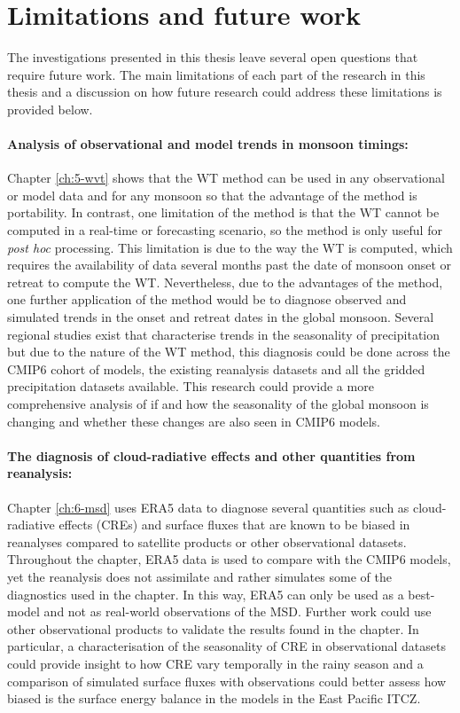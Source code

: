 \section{Limitations and future work}

The investigations presented in this thesis leave several open questions that require future work. 
The main limitations of each part of the research in this thesis and a discussion on how future research could address these limitations is provided below. 

\paragraph{Analysis of observational and model trends in monsoon timings:}
Chapter \ref{ch:5-wvt} shows that the WT method can be used in any observational or model data and for any monsoon so that the advantage of the method is portability.
In contrast, one limitation of the method is that the WT cannot be computed in a real-time or forecasting scenario, so the method is only useful for \textit{post hoc} processing. 
This limitation is due to the way the WT is computed, which requires the availability of data several months past the date of monsoon onset or retreat to compute the WT. 
Nevertheless, due to the advantages of the method, one further application of the method would be to diagnose observed and simulated trends in the onset and retreat dates in the global monsoon.
Several regional studies exist that characterise trends in the seasonality of precipitation but due to the nature of the WT method, this diagnosis could be done across the CMIP6 cohort of models, the existing reanalysis datasets and all the gridded precipitation datasets available.  
This research could provide a more comprehensive analysis of if and how the seasonality of the global monsoon is changing and whether these changes are also seen in CMIP6 models.

\paragraph{The diagnosis of cloud-radiative effects and other quantities from reanalysis:}
Chapter \ref{ch:6-msd} uses ERA5 data to diagnose several quantities such as cloud-radiative effects (CREs) and surface fluxes that are known to be biased in reanalyses compared to satellite products or other observational datasets.
Throughout the chapter, ERA5 data is used to compare with the CMIP6 models, yet the reanalysis does not assimilate and rather simulates some of the diagnostics used in the chapter.
In this way, ERA5 can only be used as a best-model and not as real-world observations of the MSD.
Further work could use other observational products to validate the results found in the chapter. 
In particular, a characterisation of the seasonality of CRE in observational datasets could provide insight to how CRE vary temporally in the rainy season and a comparison of simulated surface fluxes with observations could better assess how biased is the surface energy balance in the models in the East Pacific ITCZ.  

